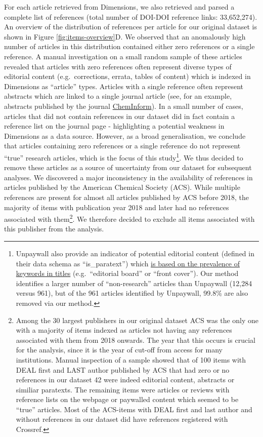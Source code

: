 \documentclass[
]{article}
\begin{document}
For each article retrieved from Dimensions, we also retrieved and parsed a complete list of references (total number of DOI-DOI reference links: 33,652,274). An overview of the distribution of references per article for our original dataset is shown in Figure \ref{fig:items-overview}D. We observed that an anomalously high number of articles in this distribution contained either zero references or a single reference. A manual investigation on a small random sample of these articles revealed that articles with zero references often represent diverse types of editorial content (e.g.~corrections, errata, tables of content) which is indexed in Dimensions as ``article'' types. Articles with a single reference often represent abstracts which are linked to a single journal article (see, for an example, abstracts published by the journal \href{https://onlinelibrary.wiley.com/journal/15222667}{ChemInform}). In a small number of cases, articles that did not contain references in our dataset did in fact contain a reference list on the journal page - highlighting a potential weakness in Dimensions as a data source. However, as a broad generalisation, we conclude that articles containing zero references or a single reference do not represent ``true'' research articles, which is the focus of this study\footnote{Unpaywall also provide an indicator of potential editorial content (defined in their data schema as ``is\_paratext'') which \href{https://support.unpaywall.org/support/solutions/articles/44001894783-what-does-is-paratext-mean-in-the-api-}{is based on the prevalence of keywords in titles} (e.g.~``editorial board'' or ``front cover''). Our method identifies a larger number of ``non-research'' articles than Unpaywall (12,284 versus 961), but of the 961 articles identified by Unpaywall, 99.8\% are also removed via our method.}. We thus decided to remove these articles as a source of uncertainty from our dataset for subsequent analyses. We discovered a major inconsistency in the availability of references in articles published by the American Chemical Society (ACS). While multiple references are present for almost all articles published by ACS before 2018, the majority of items with publication year 2018 and later had no references associated with them\footnote{Among the 30 largest publishers in our original dataset ACS was the only one with a majority of items indexed as articles not having any references associated with them from 2018 onwards. The year that this occurs is crucial for the analysis, since it is the year of cut-off from access for many institutions. Manual inspection of a sample showed that of 100 items with DEAL first and LAST author published by ACS that had zero or no references in our dataset 42 were indeed editorial content, abstracts or similiar paratexts. The remaining items were articles or reviews with reference lists on the webpage or paywalled content which seemed to be ``true'' articles. Most of the ACS-items with DEAL first and last author and without references in our dataset did have references registered with Crossref.}. We therefore decided to exclude all items associated with this publisher from the analysis.
\end{document}
